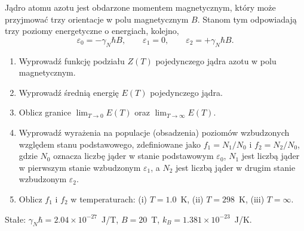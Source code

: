 
Jądro atomu azotu jest obdarzone momentem magnetycznym, który może przyjmować
trzy orientacje w polu magnetycznym $B$. Stanom tym odpowiadają trzy poziomy
energetyczne o energiach, kolejno,
\begin{equation*}
  \varepsilon_0 = -\gamma_N\hbar B, \qquad
  \varepsilon_1 = 0, \qquad
  \varepsilon_2 = +\gamma_N\hbar B .
\end{equation*}

\begin{enumerate}[label=(\alph*)]
  \item Wyprowadź funkcję podziału $Z(T)$ pojedynczego jądra azotu w polu
    magnetycznym.
  \item Wyprowadź średnią energię $E(T)$ pojedynczego jądra.
  \item Oblicz granice $\lim_{T\to 0} E(T)$ oraz $\lim_{T\to\infty} E(T)$.
  \item Wyprowadź wyrażenia na populacje (obsadzenia) poziomów wzbudzonych
    względem stanu podstawowego, zdefiniowane jako $f_1 = N_1/N_0$
    i $f_2 = N_2/N_0$, gdzie $N_0$ oznacza liczbę jąder w stanie podstawowym $\varepsilon_0$,
    $N_1$ jest liczbą jąder w pierwszym stanie wzbudzonym $\varepsilon_1$,
    a $N_2$ jest liczbą jąder w drugim stanie wzbudzonym $\varepsilon_2$.
  \item Oblicz $f_1$ i $f_2$ w temperaturach:
    (i) $T = 1.0$~K, (ii) $T = 298$~K, (iii) $T = \infty$.
\end{enumerate}

Stałe: $\gamma_N\hbar = 2.04\times 10^{-27}$~J/T, \quad $B = 20$~T, \quad
$k_B = 1.381\times 10^{-23}$~J/K.
